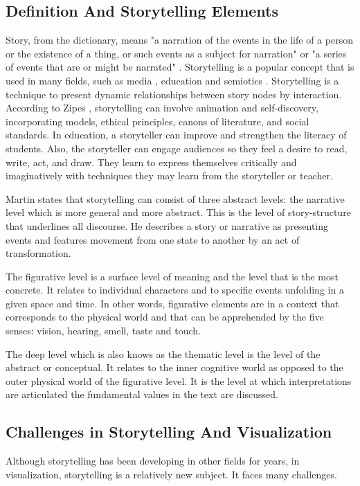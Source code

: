 \documentclass{egpubl}
\begin{document}
\subsection{Definition And Storytelling Elements}
Story, from the dictionary, means "a narration of the events in the life of a person or the existence of a thing, or such events as a subject for narration" \cite{story1} or "a series of events that are or might be narrated" \cite{story2}. Storytelling is a popular concept that is used in many fields, such as media \cite{segal}, education \cite{Jack1995} and semiotics \cite{Martin1997}.
Storytelling is a technique to present dynamic relationships between story nodes by interaction.
According to Zipes \cite{Jack1995}, storytelling can involve animation and self-discovery, incorporating models, ethical principles, canons of literature, and social standards. In education, a storyteller can improve and strengthen the literacy of students. Also, the storyteller can engage audiences so they feel a desire to read, write, act, and draw. They learn to express themselves critically and imaginatively with techniques they may learn from the storyteller or teacher.

Martin\cite{Martin1997} states that storytelling can consist of three abstract levels: the narrative level which is more general and more abstract. This is the level of story-structure that underlines all discourse. He describes a story or narrative as presenting events and features movement from one state to another by an act of transformation.

The figurative level is a surface level of meaning and the level that is the most concrete. It relates to individual characters and to specific events unfolding in a given space and time. In other words, figurative elements are in a context that corresponds to the physical world and that can be apprehended by the five senses: vision, hearing, smell, taste and touch.

The deep level which is also knows as the thematic level is the level of the abstract or conceptual. It relates to the inner cognitive world as opposed to the outer physical world of the figurative level. It is the level at which interpretations are articulated the fundamental values in the text are discussed.

\subsection{Challenges in Storytelling And Visualization}
Although storytelling has been developing in other fields for years, in visualization, storytelling is a relatively new subject. It faces many challenges.
 
\end{document}
